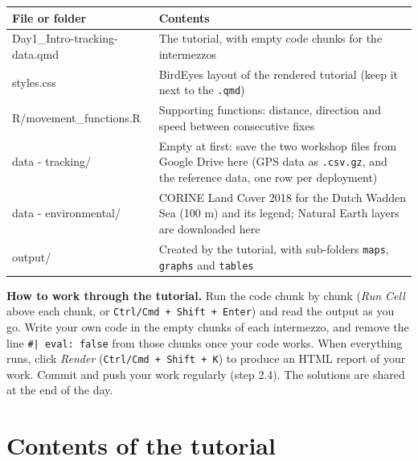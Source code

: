 \documentclass[11pt,a4paper]{article}
\begin{document}
\renewcommand{\arraystretch}{1.2}
\begin{tabularx}{\linewidth}{@{}>{\ttfamily\raggedright}p{5.6cm}>{\raggedright\arraybackslash}X@{}}
\toprule
\textrm{\textbf{File or folder}} & \textbf{Contents} \\
\midrule
Day1\_Intro-tracking-data.qmd & The tutorial, with empty code chunks for the intermezzos \\
styles.css & BirdEyes layout of the rendered tutorial (keep it next to the \texttt{.qmd}) \\
R/movement\_functions.R & Supporting functions: distance, direction and speed between consecutive fixes \\
data - tracking/ & Empty at first: save the two workshop files from Google Drive here (GPS data as \texttt{.csv.gz}, and the reference data, one row per deployment) \\
data - environmental/ & CORINE Land Cover 2018 for the Dutch Wadden Sea (100 m) and its legend; Natural Earth layers are downloaded here \\
output/ & Created by the tutorial, with sub-folders \texttt{maps}, \texttt{graphs} and \texttt{tables} \\
\bottomrule
\end{tabularx}

\textbf{How to work through the tutorial.} Run the code chunk by chunk (\textit{Run Cell} above each chunk, or \texttt{Ctrl/Cmd + Shift + Enter}) and read the output as you go. Write your own code in the empty chunks of each intermezzo, and remove the line \texttt{\#| eval: false} from those chunks once your code works. When everything runs, click \textit{Render} (\texttt{Ctrl/Cmd + Shift + K}) to produce an HTML report of your work. Commit and push your work regularly (step 2.4). The solutions are shared at the end of the day.

\section{Contents of the tutorial}
\end{document}
